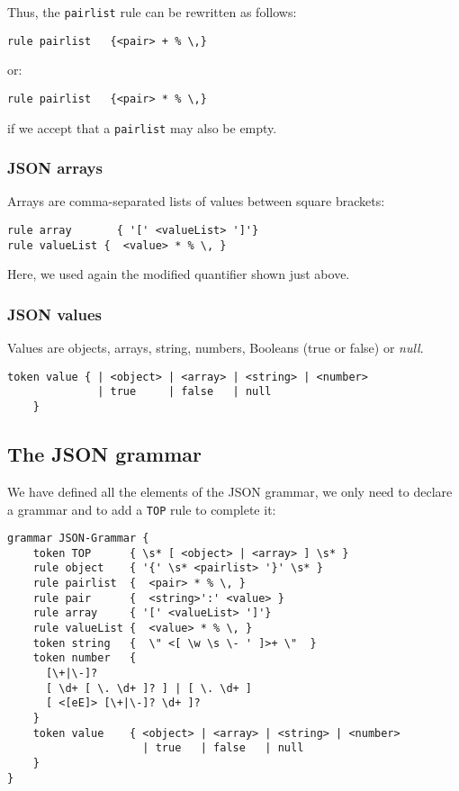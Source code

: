 Thus, the {\tt pairlist} rule can be rewritten as follows:

\begin{verbatim}
rule pairlist   {<pair> + % \,}
\end{verbatim}

or:

\begin{verbatim}
rule pairlist   {<pair> * % \,}
\end{verbatim}

if we accept that a {\tt pairlist} may also be empty.

\subsubsection{JSON arrays}

Arrays are comma-separated lists of values between square 
brackets:

\begin{verbatim}
rule array       { '[' <valueList> ']'}
rule valueList {  <value> * % \, }
\end{verbatim}

Here, we used again the modified quantifier shown 
just above.

\subsubsection{JSON values}

Values are objects, arrays, string, numbers, Booleans 
(true or false) or \emph{null}.

\begin{verbatim}
token value { | <object> | <array> | <string> | <number> 
              | true     | false   | null 
    }
\end{verbatim}

\subsection{The JSON grammar}

We have defined all the elements of the JSON grammar, we 
only need to declare a grammar and to add a {\tt TOP} rule 
to complete it:

\begin{verbatim}
grammar JSON-Grammar {
    token TOP      { \s* [ <object> | <array> ] \s* }
    rule object    { '{' \s* <pairlist> '}' \s* }
    rule pairlist  {  <pair> * % \, }
    rule pair      {  <string>':' <value> }
    rule array     { '[' <valueList> ']'}
    rule valueList {  <value> * % \, }
    token string   {  \" <[ \w \s \- ' ]>+ \"  }
    token number   { 
      [\+|\-]?  
      [ \d+ [ \. \d+ ]? ] | [ \. \d+ ]  
      [ <[eE]> [\+|\-]? \d+ ]?
    }
    token value    { <object> | <array> | <string> | <number> 
                     | true   | false   | null 
    }
}
\end{verbatim}

